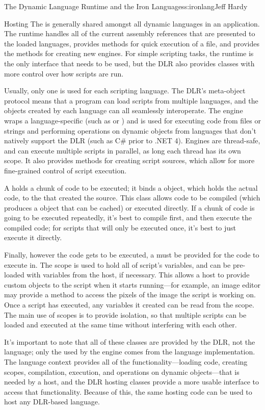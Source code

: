 \begin{aosachapter}{The Dynamic Language Runtime and the Iron Languages}{s:ironlang}{Jeff Hardy}
\begin{aosasect1}{Hosting}
The  is generally shared amongst all dynamic languages in
an application. The runtime handles all of the current assembly references that
are presented to the loaded languages, provides methods for quick execution of
a file, and provides the methods for creating new engines. For simple scripting
tasks, the runtime is the only interface that needs to be used, but the DLR
also provides classes with more control over how scripts are run.

Usually, only one  is used for each scripting language. The
DLR's meta-object protocol means that a program can load scripts from multiple
languages, and the objects created by each language can all seamlessly
interoperate. The engine wraps a language-specific  (such
as  or ) and is used for executing code
from files or strings and performing operations on dynamic objects from
languages that don't natively support the DLR (such as C\# prior to .NET 4).
Engines are thread-safe, and can execute multiple scripts in parallel, as long
each thread has its own scope. It also provides methods for creating script
sources, which allow for more fine-grained control of script execution. 

A  holds a chunk of code to be executed; it binds a
 object, which holds the actual code, to the
 that created the source. This class allows code to be
compiled (which produces a  object that can be cached) or
executed directly. If a chunk of code is going to be executed repeatedly, it's
best to compile first, and then execute the compiled code; for scripts that
will only be executed once, it's best to just execute it directly.

Finally, however the code gets to be executed, a  must be
provided for the code to execute in. The scope is used to hold all of script's
variables, and can be pre-loaded with variables from the host, if necessary.
This allows a host to provide custom objects to the script when it starts
running---for example, an image editor may provide a method to access the
pixels of the image the script is working on. Once a script has executed, any
variables it created can be read from the scope. The main use of scopes is to
provide isolation, so that multiple scripts can be loaded and executed at the
same time without interfering with each other.

It's important to note that all of these classes are provided by the DLR, not
the language; only the  used by the engine comes from the
language implementation. The language context provides all of the
functionality---loading code, creating scopes, compilation, execution, and
operations on dynamic objects---that is needed by a host, and the DLR hosting
classes provide a more usable interface to access that functionality. Because
of this, the same hosting code can be used to host any DLR-based language.


\end{aosasect1}
\end{aosachapter}
